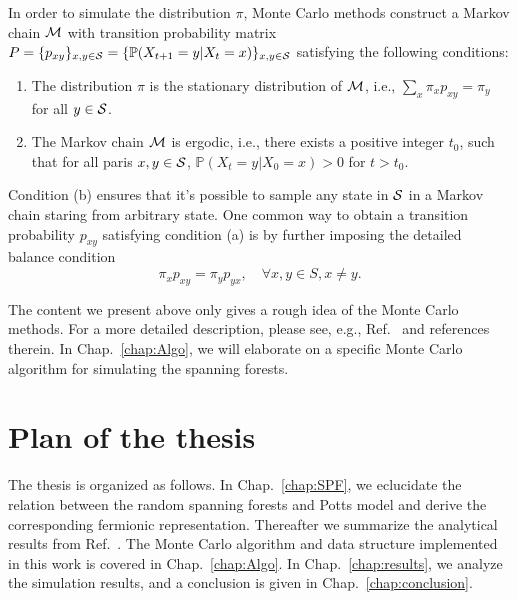 In order to simulate the distribution $\pi$, Monte Carlo methods construct a Markov chain ${\mathcal M}$ with transition probability matrix 
$P = \{p_{xy}\}_{x, y\in {\mathcal S}} = \{\mathbb{P}(X_{t+1} = y|X_{t} = x)\}_{x, y\in {\mathcal S}}$ satisfying the following conditions:
\begin{enumerate}[label=(\alph*)]
	\item The distribution $\pi$ is the stationary distribution of ${\mathcal M}$, i.e.,  $\sum_x \pi_x p_{xy} = \pi_y$ for all $y\in {\mathcal S}$.
	\item The Markov chain ${\mathcal M}$ is ergodic, i.e., there exists a positive integer $t_0$, such that for all paris $x, y \in {\mathcal S}$, 
	$\mathbb{P}(X_t = y|X_0 = x) > 0$ for $t > t_0$.
\end{enumerate}
Condition (b) ensures that it's possible to sample any state in ${\mathcal S}$ in a Markov chain staring from arbitrary state.
One common way to obtain a transition probability $p_{xy}$ satisfying condition (a) is by further imposing the detailed balance condition
\begin{equation}
	\pi_x p_{xy} = \pi_y p_{yx}, \quad \forall x, y \in S, x\neq y.
\end{equation}

The content we present above only gives a rough idea of the Monte Carlo methods. For a more detailed description, please see, e.g., Ref.~ and references therein.
In Chap.~\ref{chap:Algo}, we will elaborate on a specific Monte Carlo algorithm for simulating the spanning forests.

\section{Plan of the thesis}
The thesis is organized as follows. In Chap.~\ref{chap:SPF}, we eclucidate the relation between the random spanning forests and
Potts model and derive the corresponding fermionic representation. Thereafter we summarize the analytical results from Ref.~.
The Monte Carlo algorithm and data structure implemented in this work is covered in Chap.~\ref{chap:Algo}. In Chap.~\ref{chap:results}, we analyze the simulation results, and a conclusion is given in Chap.~\ref{chap:conclusion}.




